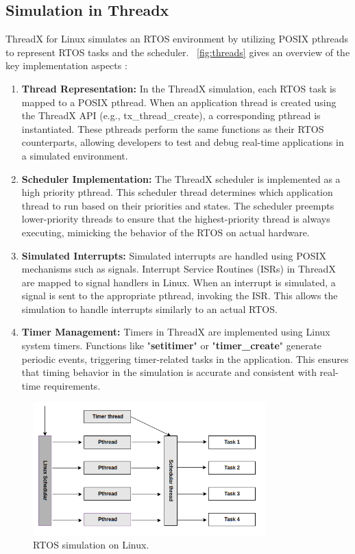 \subsection{Simulation in Threadx}
ThreadX for Linux simulates an RTOS environment by utilizing POSIX pthreads to represent RTOS tasks and the scheduler. ~\autoref{fig:threads} gives an overview of the key implementation aspects \cite{threadx_readme}:
\begin{enumerate}
\item \textbf{Thread Representation: }
In the ThreadX simulation, each RTOS task is mapped to a POSIX pthread. When an application thread is created using the ThreadX API (e.g., tx\_thread\_create), a corresponding pthread is instantiated. These pthreads perform the same functions as their RTOS counterparts, allowing developers to test and debug real-time applications in a simulated environment.
\item \textbf{Scheduler Implementation: } 
The ThreadX scheduler is implemented as a high priority pthread. This scheduler thread determines which application thread to run based on their priorities and states. The scheduler preempts lower-priority threads to ensure that the highest-priority thread is always executing, mimicking the behavior of the RTOS on actual hardware.
\item \textbf{Simulated Interrupts: }
Simulated interrupts are handled using POSIX mechanisms such as signals. Interrupt Service Routines (ISRs) in ThreadX are mapped to signal handlers in Linux. When an interrupt is simulated, a signal is sent to the appropriate pthread, invoking the ISR. This allows the simulation to handle interrupts similarly to an actual RTOS.
\item \textbf{Timer Management: }
Timers in ThreadX are implemented using Linux system timers. Functions like "\textbf{setitimer}" or "\textbf{timer\_create}" generate periodic events, triggering timer-related tasks in the application. This ensures that timing behavior in the simulation is accurate and consistent with real-time requirements.
\end{enumerate}
\begin{figure}[htpb]
  \centering
  \includegraphics[width=0.8\textwidth]{figures/threads2}
  \caption{RTOS simulation on Linux.} \label{fig:threads}
\end{figure}


